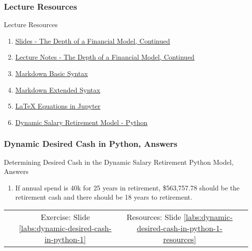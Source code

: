 \documentclass[handout, 11pt]{beamer}
\begin{document}
\appendix
{}
\setcounter{finalframe}{\value{framenumber}}
\begin{frame}
\frametitle{Lecture Resources}
{
\begin{block}{Lecture Resources}
\begin{enumerate}
\item \textcolor{blue}{\underline{\href{https://nickderobertis.github.io/fin-model-course/\_static/generated/pdfs/S5 The Depth of a Financial Model, Continued.pdf}{Slides - The Depth of a Financial Model, Continued}}}
\item \textcolor{blue}{\underline{\href{https://nickderobertis.github.io/fin-model-course/\_static/generated/pdfs/LN5 The Depth of a Financial Model, Continued.pdf}{Lecture Notes - The Depth of a Financial Model, Continued}}}
\item \textcolor{blue}{\underline{\href{https://www.markdownguide.org/basic-syntax/}{Markdown Basic Syntax}}}
\item \textcolor{blue}{\underline{\href{https://www.markdownguide.org/extended-syntax/}{Markdown Extended Syntax}}}
\item \textcolor{blue}{\underline{\href{https://medium.com/analytics-vidhya/writing-math-equations-in-jupyter-notebook-a-naive-introduction-a5ce87b9a214}{LaTeX Equations in Jupyter}}}
\item \textcolor{blue}{\underline{\href{https://nickderobertis.github.io/fin-model-course/\_static/Examples/Introduction/Python/Dynamic Salary Retirement Model.ipynb}{Dynamic Salary Retirement Model - Python}}}
\end{enumerate}
\vfill
\end{block}
}
\label{frames:resources}
\end{frame}
\begin{frame}
\frametitle{Dynamic Desired Cash in Python, Answers}
{
\begin{block}{Determining Desired Cash in the Dynamic Salary Retirement Python Model, Answers}
\begin{enumerate}
\item If annual spend is 40k for 25 years in retirement, \$563,757.78 should be the retirement cash and there should be 18 years to retirement.
\end{enumerate}
\vfill
\begin{tabular*}{\textwidth}{@{\extracolsep{\fill}}cccc}
\toprule
\hfill & Exercise: Slide \textcolor{blue}{\underline{\ref{labs:dynamic-desired-cash-in-python-1}}} & Resources: Slide \textcolor{blue}{\underline{\ref{labs:dynamic-desired-cash-in-python-1-resources}}} & \hfill\\

\end{tabular*}
\end{block}
}
\label{labs:dynamic-desired-cash-in-python-1-answers}
\end{frame}
\end{document}
